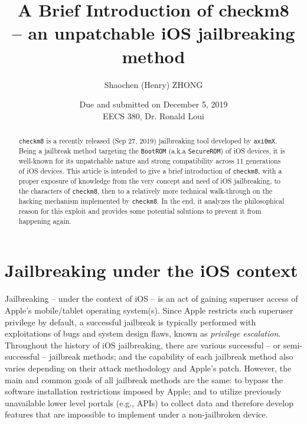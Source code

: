 \documentclass[10pt]{article}
\newcommand{\inlinecode}{\texttt}
\begin{document}
\linespread{1}


\title{\textbf{A Brief Introduction of checkm8} \\
        \large \textbf{-- an unpatchable iOS jailbreaking method\\}}

\author{Shaochen (Henry) ZHONG}
\date{Due and submitted on December 5, 2019\\EECS 380, Dr. Ronald Loui}
\maketitle

\begin{abstract}
    \inlinecode{checkm8} is a recently released (Sep 27, 2019) jailbreaking tool developed by \inlinecode{axi0mX}. Being a jailbreak method targeting the \inlinecode{BootROM} (a.k.a \inlinecode{SecureROM}) of iOS devices, it is well-known for its unpatchable nature and strong compatibility across 11 generations of iOS devices. This article is intended to give a brief introduction of \inlinecode{checkm8}, with a proper exposure of knowledge from the very concept and need of iOS jailbreaking, to the characters of \inlinecode{checkm8}, then to a relatively more technical walk-through on the hacking mechanism implemented by \inlinecode{checkm8}. In the end, it analyzes the philosophical reason for this exploit and provides some potential solutions to prevent it from happening again.
\end{abstract}





\vspace{0.5cm}
{\hypersetup{hidelinks}
\tableofcontents
}


\newpage

\section{Jailbreaking under the iOS context}

Jailbreaking -- under the context of iOS -- is an act of gaining superuser access of Apple's mobile/tablet operating system(s). Since Apple restricts such superuser privilege by default, a successful jailbreak is typically performed with exploitations of bugs and system design flaws, known as \textit{privilege escalation}. Throughout the history of iOS jailbreaking, there are various successful -- or semi-successful -- jailbreak methods; and the capability of each jailbreak method also varies depending on their attack methodology and Apple's patch. However, the main and common goals of all jailbreak methods are the same: to bypass the software installation restrictions imposed by Apple; and to utilize previously unavailable lower level portals (e.g., APIs) to collect data and therefore develop features that are impossible to implement under a non-jailbroken device.
\end{document}
